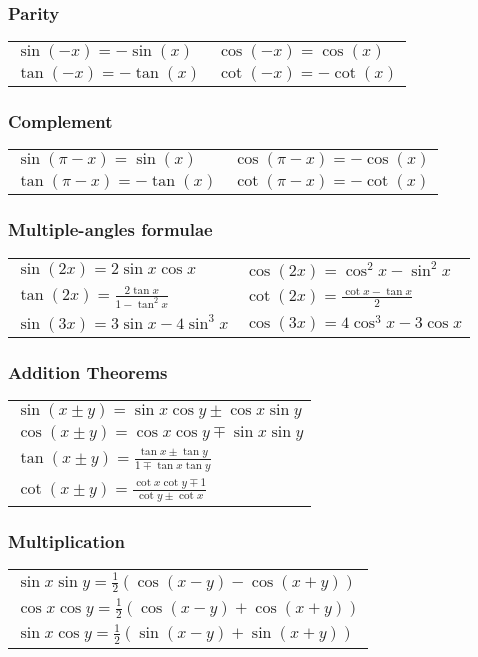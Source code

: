 \documentclass[a4paper, 10pt]{article}
\theoremstyle{definition}
\begin{document}
\subsubsection*{Parity}
\begin{tabularx}{\linewidth}{XX}
    $\sin(-x) = - \sin(x)$ & $\cos(-x) = \cos(x)$ \\
    $\tan(-x) = - \tan(x)$ & $\cot(-x) = -\cot(x)$
\end{tabularx}

\subsubsection*{Complement}
\begin{tabularx}{\linewidth}{XX}
    $\sin(\pi - x) = \sin(x)$ & $\cos(\pi - x) = -\cos(x)$ \\
    $\tan(\pi - x) = - \tan(x)$ & $\cot(\pi - x) = -\cot(x)$
\end{tabularx}

\subsubsection*{Multiple-angles formulae}
\begin{tabularx}{\linewidth}{XX}
    $\sin(2x) = 2 \sin x \cos x $ & $\cos(2x) = \cos^2x - \sin^2x$ \\
    $\tan(2x) = \frac{2 \tan x}{1 - \tan^2x}$ & $\cot(2x) = \frac{\cot x - \tan x}{2}$ \\
    $\sin(3x) = 3 \sin x - 4 \sin^3 x$ & $\cos(3x) = 4 \cos^3 x - 3 \cos x$
\end{tabularx}

\subsubsection*{Addition Theorems}
\begin{tabularx}{\linewidth}{X}
    $\sin(x \pm y) = \sin x \cos y \pm \cos x \sin y$ \\
    $\cos(x \pm y) = \cos x \cos y \mp \sin x \sin y$ \\
    $\tan(x \pm y) = \frac{\tan x \pm \tan y}{1 \mp \tan x \tan y}$ \\
    $\cot(x \pm y) = \frac{\cot x \cot y \mp 1}{\cot y \pm \cot x}$
\end{tabularx}

\subsubsection*{Multiplication}
\begin{tabularx}{\linewidth}{X}
    $\sin x \sin y = \frac{1}{2}(\cos(x - y) - \cos(x + y))$ \\
    $\cos x \cos y = \frac{1}{2}(\cos(x - y) + \cos(x + y))$ \\
    $\sin x \cos y = \frac{1}{2}(\sin(x - y) + \sin(x + y))$ \\
\end{tabularx}
\end{document}
